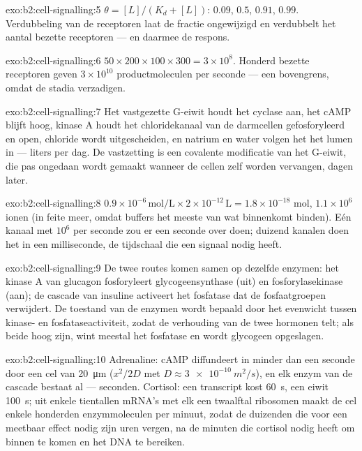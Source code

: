 \begin{solution}{exo:b2:cell-signalling:5}
$\theta = [L]/(K_d + [L])$: $0.09$, $0.5$, $0.91$, $0.99$. Verdubbeling van
de receptoren laat de fractie ongewijzigd en verdubbelt het aantal bezette
receptoren --- en daarmee de respons.
\end{solution}

\begin{solution}{exo:b2:cell-signalling:6}
$50\times 200\times 100\times 300 = 3\times 10^{8}$. Honderd bezette
receptoren geven $3\times 10^{10}$ productmoleculen per seconde --- een
bovengrens, omdat de stadia verzadigen.
\end{solution}

\begin{solution}{exo:b2:cell-signalling:7}
Het vastgezette G-eiwit houdt het cyclase aan, het cAMP blijft hoog, kinase A
houdt het chloridekanaal van de darmcellen gefosforyleerd en open, chloride
wordt uitgescheiden, en natrium en water volgen het het lumen in --- liters
per dag. De vastzetting is een covalente modificatie van het G-eiwit, die pas
ongedaan wordt gemaakt wanneer de cellen zelf worden vervangen, dagen later.
\end{solution}

\begin{solution}{exo:b2:cell-signalling:8}
$0.9\times 10^{-6}\,\text{mol/L}\times 2\times 10^{-12}\,\text{L} =
1.8\times 10^{-18}$ mol, $1.1\times 10^{6}$ ionen (in feite meer, omdat
buffers het meeste van wat binnenkomt binden). Eén kanaal met $10^{6}$ per
seconde zou er een seconde over doen; duizend kanalen doen het in een
milliseconde, de tijdschaal die een signaal nodig heeft.
\end{solution}

\begin{solution}{exo:b2:cell-signalling:9}
De twee routes komen samen op dezelfde enzymen: het kinase A van glucagon
fosforyleert glycogeensynthase (uit) en fosforylasekinase (aan); de cascade
van insuline activeert het fosfatase dat de fosfaatgroepen verwijdert. De
toestand van de enzymen wordt bepaald door het evenwicht tussen kinase- en
fosfataseactiviteit, zodat de verhouding van de twee hormonen telt; als beide
hoog zijn, wint meestal het fosfatase en wordt glycogeen opgeslagen.
\end{solution}

\begin{solution}{exo:b2:cell-signalling:10}
Adrenaline: cAMP diffundeert in minder dan een seconde door een cel van
\qty{20}{\micro m} ($x^{2}/2D$ met $D \approx \qty{3e-10}{m^2/s}$), en elk
enzym van de cascade bestaat al --- seconden. Cortisol: een transcript kost
\qty{60}{s}, een eiwit \qty{100}{s}; uit enkele tientallen mRNA's met elk een
twaalftal ribosomen maakt de cel enkele honderden enzymmoleculen per minuut,
zodat de duizenden die voor een meetbaar effect nodig zijn uren vergen, na
de minuten die cortisol nodig heeft om binnen te komen en het DNA te bereiken.
\end{solution}

